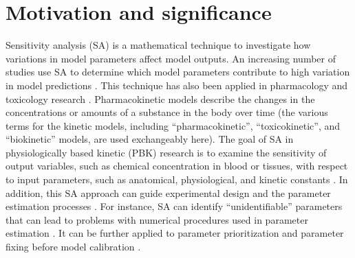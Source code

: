 \documentclass[preprint,12pt, a4paper]{elsarticle}
\begin{document}
\linenumbers


\newpage

\section{Motivation and significance}

Sensitivity analysis (SA) is a mathematical technique to investigate how variations in model parameters affect model outputs. An increasing number of studies use SA to determine which model parameters contribute to high variation in model predictions \cite{ferretti2016trends}. This technique has also been applied in pharmacology and toxicology research \cite{loizou2015application, mcnally2012reconstruction}. Pharmacokinetic models describe the changes in the concentrations or amounts of a substance in the body over time (the various terms for the kinetic models, including ``pharmacokinetic'', ``toxicokinetic'', and ``biokinetic'' models, are used exchangeably here). The goal of SA in physiologically based kinetic (PBK) research is to examine the sensitivity of output variables, such as chemical concentration in blood or tissues, with respect to input parameters, such as anatomical, physiological, and kinetic constants \cite{mcnally2011workflow}. In addition, this SA approach can guide experimental design and the parameter estimation processes \cite{zhang2015sobol}. For instance, SA can identify ``unidentifiable'' parameters that can lead to problems with numerical procedures used in parameter estimation \cite{chu2010quantitative}. It can be further applied to parameter prioritization and parameter fixing before model calibration \cite{fphar201800588}.
\end{document}
